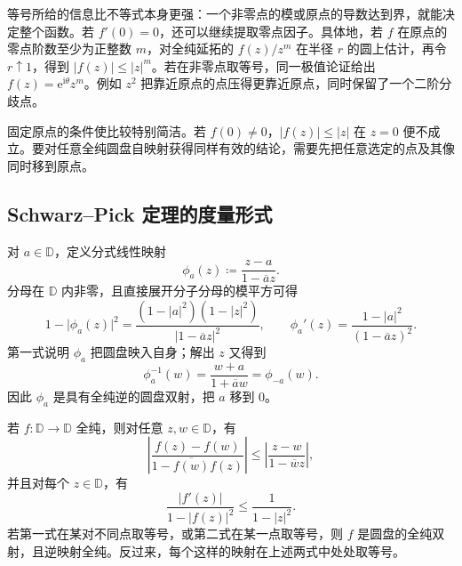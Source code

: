 等号所给的信息比不等式本身更强：一个非零点的模或原点的导数达到界，就能决定整个函数。若 \(f'(0)=0\)，还可以继续提取零点因子。具体地，若 \(f\) 在原点的零点阶数至少为正整数 \(m\)，对全纯延拓的 \(f(z)/z^m\) 在半径 \(r\) 的圆上估计，再令 \(r\uparrow1\)，得到 \(\lvert f(z)\rvert\leq\lvert z\rvert^m\)。若在非零点取等号，同一极值论证给出 \(f(z)=\mathrm{e}^{\mathrm{i}\theta}z^m\)。例如 \(z^2\) 把靠近原点的点压得更靠近原点，同时保留了一个二阶分歧点。

\ProseParagraphBreak

固定原点的条件使比较特别简洁。若 \(f(0)\ne0\)，\(\lvert f(z)\rvert\leq\lvert z\rvert\) 在 \(z=0\) 便不成立。要对任意全纯圆盘自映射获得同样有效的结论，需要先把任意选定的点及其像同时移到原点。

\subsection{Schwarz–Pick 定理的度量形式}
\label{g4:subsec:0103:03}
对 \(a\in\mathbb D\)，定义分式线性映射
\begin{equation}
	\label{g4:eq:0103:disk-normalization}
	\phi_a(z)\coloneqq\frac{z-a}{1-\overline a z}.
\end{equation}
分母在 \(\mathbb D\) 内非零，且直接展开分子分母的模平方可得
\begin{equation}
	\label{g4:eq:0103:disk-normalization-identities}
	1-\lvert\phi_a(z)\rvert^2
	=\frac{(1-\lvert a\rvert^2)(1-\lvert z\rvert^2)}{\lvert1-\overline a z\rvert^2},
	\qquad
	\phi_a'(z)=\frac{1-\lvert a\rvert^2}{(1-\overline a z)^2}.
\end{equation}
第一式说明 \(\phi_a\) 把圆盘映入自身；解出 \(z\) 又得到
\[
	\phi_a^{-1}(w)=\frac{w+a}{1+\overline a w}=\phi_{-a}(w).
\]
因此 \(\phi_a\) 是具有全纯逆的圆盘双射，把 \(a\) 移到 \(0\)。

\begin{theorem}
	\label{g4:thm:0103:schwarz-pick}
	若 \(f\colon\mathbb D\rightarrow\mathbb D\) 全纯，则对任意 \(z,w\in\mathbb D\)，有
	\begin{equation}
		\label{g4:eq:0103:schwarz-pick-two-points}
		\left\lvert\frac{f(z)-f(w)}{1-\overline{f(w)}f(z)}\right\rvert
		\leq
		\left\lvert\frac{z-w}{1-\overline w z}\right\rvert,
	\end{equation}
	并且对每个 \(z\in\mathbb D\)，有
	\begin{equation}
		\label{g4:eq:0103:schwarz-pick-derivative}
		\frac{\lvert f'(z)\rvert}{1-\lvert f(z)\rvert^2}
		\leq\frac1{1-\lvert z\rvert^2}.
	\end{equation}
	若第一式在某对不同点取等号，或第二式在某一点取等号，则 \(f\) 是圆盘的全纯双射，且逆映射全纯。反过来，每个这样的映射在上述两式中处处取等号。
\end{theorem}

